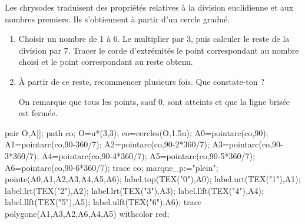 \begin{corrige}
   Les chrysodes traduisent des propriétés relatives à la division euclidienne et aux nombres premiers. Ils s'obtiennent à partir d'un cercle gradué.

   \begin{enumerate}
      \item Choisir un nombre de 1 à 6. Le multiplier par 3, puis calculer le reste de la division par 7. Tracer le corde d'extrémités le point correspondant au nombre choisi et le point correspondant au reste obtenu.
      \item À partir de ce reste, recommencer plusieurs fois. Que constate-ton ?
      
      {\color{red}On remarque que tous les points, sauf 0,  sont atteints et que la ligne brisée est fermée.}
   \end{enumerate}
   \begin{minipage}{\linewidth}
      \begin{center}
         \begin{Geometrie}
            pair O,A[];
            path co;
            O=u*(3,3);
            co=cercles(O,1.5u);
            A0=pointarc(co,90);
            A1=pointarc(co,90-360/7);
            A2=pointarc(co,90-2*360/7);
            A3=pointarc(co,90-3*360/7);
            A4=pointarc(co,90-4*360/7);
            A5=pointarc(co,90-5*360/7);
            A6=pointarc(co,90-6*360/7);
            trace co;
            marque_p:="plein";
            pointe(A0,A1,A2,A3,A4,A5,A6);
            label.top(TEX("0"),A0);
            label.urt(TEX("1"),A1);
            label.lrt(TEX("2"),A2);
            label.lrt(TEX("3"),A3);
            label.llft(TEX("4"),A4);
            label.llft(TEX("5"),A5);
            label.ulft(TEX("6"),A6);
            trace polygone(A1,A3,A2,A6,A4,A5) withcolor red;
         \end{Geometrie}
      \end{center}
   \end{minipage}
\end{corrige}
